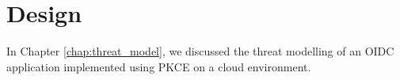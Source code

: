 \chapter{Design}

In Chapter \ref{chap:threat_model}, we discussed the threat modelling of an OIDC application implemented using PKCE on a cloud environment. 